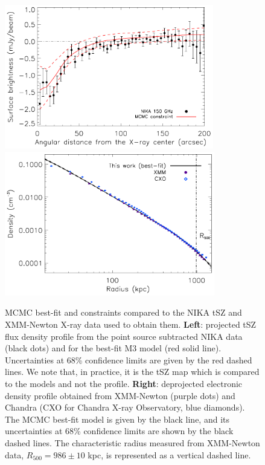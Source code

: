 \documentclass[twocolumn,traditabstract]{aa}
\begin{document}
\begin{figure}[h]
\centering
\includegraphics[height=6.3cm]{Figure/MACSJ1424_profile_ML.pdf}
\includegraphics[height=6.3cm]{Figure/ICM_density_profile.pdf}
\caption{\footnotesize MCMC best-fit and constraints compared to the NIKA tSZ and XMM-Newton X-ray data used to obtain them. {\bf Left}: projected tSZ flux density profile from the point source subtracted NIKA data (black dots) and for the best-fit M3 model (red solid line). Uncertainties at 68\% confidence limits are given by the red dashed lines. We note that, in practice, it is the tSZ map which is compared to the models and not the profile. {\bf Right}: deprojected electronic density profile obtained from XMM-Newton (purple dots) and Chandra (CXO for Chandra X-ray Observatory, blue diamonds). The MCMC best-fit model is given by the black line, and its uncertainties at 68\% confidence limits are shown by the black dashed lines. The characteristic radius measured from XMM-Newton data, $R_{500} = 986 \pm 10$ kpc, is represented as a vertical dashed line.}
\label{fig:MACSJ1424_MCMC_vs_data}
\end{figure}
\end{document}
